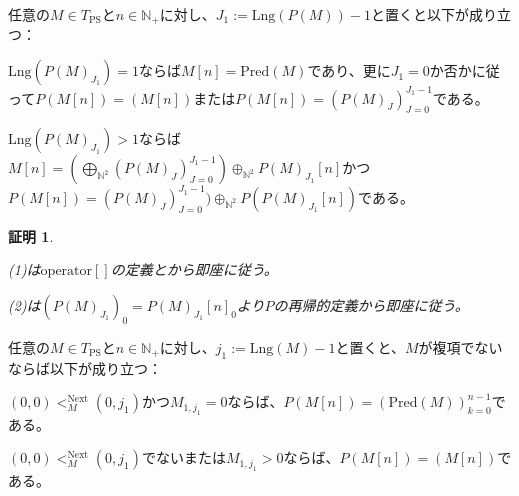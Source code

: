 \documentclass[dvipdfmx,uplatex]{jsarticle}
\theoremstyle{customnonumberbreakfortheorem}
\theoremstyle{customnonumberbreakforproof}
\newtheorem{hideableproof}{証明}
\begin{document}
\begin{proposition}[\(P\)と基本列の関係]\label{Pと基本列の関係}
	任意の\(M \in T_{\textrm{PS}}\)と\(n \in \mathbb{N}_{+}\)に対し、\(J_1 := \textrm{Lng}(P(M))-1\)と置くと以下が成り立つ：
	\begin{penumerate}
		\item \(\textrm{Lng}(P(M)_{J_1}) = 1\)ならば\(M[n] = \textrm{Pred}(M)\)であり、更に\(J_1 = 0\)か否かに従って\(P(M[n]) = (M[n])\)または\(P(M[n]) = (P(M)_J)_{J=0}^{J_1-1}\)である。
		\item \(\textrm{Lng}(P(M)_{J_1}) > 1\)ならば\(M[n] = (\bigoplus_{\mathbb{N}^2} (P(M)_J)_{J=0}^{J_1-1}) \oplus_{\mathbb{N}^2} P(M)_{J_1}[n]\)かつ\(P(M[n]) = (P(M)_J)_{J=0}^{J_1-1}) \oplus_{\mathbb{N}^2} P(P(M)_{J_1}[n])\)である。
	\end{penumerate}
\end{proposition}

\begin{hideableproof}
	\begin{indented}
		\item (1)は\(\textrm{operator}[]\)の定義とから即座に従う。
		\item (2)は\((P(M)_{J_1})_0 = P(M)_{J_1}[n]_0\)より\(P\)の再帰的定義から即座に従う。
	\end{indented}
\end{hideableproof}

\begin{proposition}[非複項性と基本列の関係]\label{非複項性と基本列の関係}
	任意の\(M \in T_{\textrm{PS}}\)と\(n \in \mathbb{N}_{+}\)に対し、\(j_1 := \textrm{Lng}(M)-1\)と置くと、\(M\)が複項でないならば以下が成り立つ：
	\begin{penumerate}
		\item \((0,0) <_M^{\textrm{Next}} (0,j_1)\)かつ\(M_{1,j_1} = 0\)ならば、\(P(M[n]) = (\textrm{Pred}(M))_{k=0}^{n-1}\)である。
		\item \((0,0) <_M^{\textrm{Next}} (0,j_1)\)でないまたは\(M_{1,j_1} > 0\)ならば、\(P(M[n]) = (M[n])\)である。
	\end{penumerate}
\end{proposition}
\end{document}
